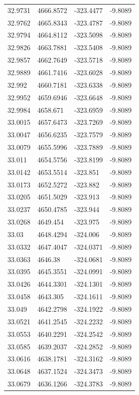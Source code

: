 \begin{table}[H]
\begin{tabular}{llll}
32.9731 & 4666.8572 & -323.4477 & -9.8089 \\
32.9762 & 4665.8343 & -323.4787 & -9.8089 \\
32.9794 & 4664.8112 & -323.5098 & -9.8089 \\
32.9826 & 4663.7881 & -323.5408 & -9.8089 \\
32.9857 & 4662.7649 & -323.5718 & -9.8089 \\
32.9889 & 4661.7416 & -323.6028 & -9.8089 \\
32.992 & 4660.7181 & -323.6338 & -9.8089 \\
32.9952 & 4659.6946 & -323.6648 & -9.8089 \\
32.9984 & 4658.671 & -323.6959 & -9.8089 \\
33.0015 & 4657.6473 & -323.7269 & -9.8089 \\
33.0047 & 4656.6235 & -323.7579 & -9.8089 \\
33.0079 & 4655.5996 & -323.7889 & -9.8089 \\
33.011 & 4654.5756 & -323.8199 & -9.8089 \\
33.0142 & 4653.5514 & -323.851 & -9.8089 \\
33.0173 & 4652.5272 & -323.882 & -9.8089 \\
33.0205 & 4651.5029 & -323.913 & -9.8089 \\
33.0237 & 4650.4785 & -323.944 & -9.8089 \\
33.0268 & 4649.454 & -323.975 & -9.8089 \\
33.03 & 4648.4294 & -324.006 & -9.8089 \\
33.0332 & 4647.4047 & -324.0371 & -9.8089 \\
33.0363 & 4646.38 & -324.0681 & -9.8089 \\
33.0395 & 4645.3551 & -324.0991 & -9.8089 \\
33.0426 & 4644.3301 & -324.1301 & -9.8089 \\
33.0458 & 4643.305 & -324.1611 & -9.8089 \\
33.049 & 4642.2798 & -324.1922 & -9.8089 \\
33.0521 & 4641.2545 & -324.2232 & -9.8089 \\
33.0553 & 4640.2291 & -324.2542 & -9.8089 \\
33.0585 & 4639.2037 & -324.2852 & -9.8089 \\
33.0616 & 4638.1781 & -324.3162 & -9.8089 \\
33.0648 & 4637.1524 & -324.3473 & -9.8089 \\
33.0679 & 4636.1266 & -324.3783 & -9.8089 \\

\end{tabular}
\end{table}
